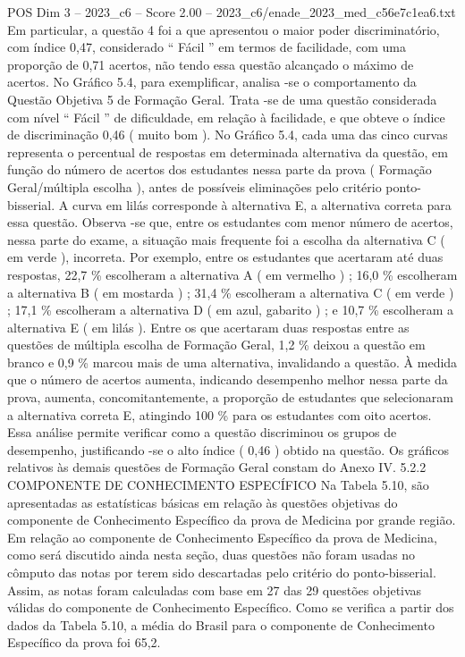 \begin{textsample}{POS Dim 3 – 2023\_c6 – Score 2.00 – 2023\_c6/enade\_2023\_med\_c56e7c1ea6.txt}
Em particular, a questão 4 foi a que apresentou o maior poder discriminatório, com índice 0,47, considerado “ Fácil ” em termos de facilidade, com uma proporção de 0,71 acertos, não tendo essa questão alcançado o máximo de acertos.
No Gráfico 5.4, para exemplificar, analisa -se o comportamento da Questão Objetiva 5 de Formação Geral.
Trata -se de uma questão considerada com nível “ Fácil ” de dificuldade, em relação à facilidade, e que obteve o índice de discriminação 0,46 ( muito bom ).
No Gráfico 5.4, cada uma das cinco curvas representa o percentual de respostas em determinada alternativa da questão, em função do número de acertos dos estudantes nessa parte da prova ( Formação Geral/múltipla escolha ), antes de possíveis eliminações pelo critério ponto-bisserial.
A curva em lilás corresponde à alternativa E, a alternativa correta para essa questão.
Observa -se que, entre os estudantes com menor número de acertos, nessa parte do exame, a situação mais frequente foi a escolha da alternativa C ( em verde ), incorreta.
Por exemplo, entre os estudantes que acertaram até duas respostas, 22,7 \% escolheram a alternativa A ( em vermelho ) ; 16,0 \% escolheram a alternativa B ( em mostarda ) ; 31,4 \% escolheram a alternativa C ( em verde ) ; 17,1 \% escolheram a alternativa D ( em azul, gabarito ) ; e 10,7 \% escolheram a alternativa E ( em lilás ).
Entre os que acertaram duas respostas entre as questões de múltipla escolha de Formação Geral, 1,2 \% deixou a questão em branco e 0,9 \% marcou mais de uma alternativa, invalidando a questão.
À medida que o número de acertos aumenta, indicando desempenho melhor nessa parte da prova, aumenta, concomitantemente, a proporção de estudantes que selecionaram a alternativa correta E, atingindo 100 \% para os estudantes com oito acertos.
Essa análise permite verificar como a questão discriminou os grupos de desempenho, justificando -se o alto índice ( 0,46 ) obtido na questão.
Os gráficos relativos às demais questões de Formação Geral constam do Anexo IV. 5.2.2 COMPONENTE DE CONHECIMENTO ESPECÍFICO Na Tabela 5.10, são apresentadas as estatísticas básicas em relação às questões objetivas do componente de Conhecimento Específico da prova de Medicina por grande região.
Em relação ao componente de Conhecimento Específico da prova de Medicina, como será discutido ainda nesta seção, duas questões não foram usadas no cômputo das notas por terem sido descartadas pelo critério do ponto-bisserial.
Assim, as notas foram calculadas com base em 27 das 29 questões objetivas válidas do componente de Conhecimento Específico.
Como se verifica a partir dos dados da Tabela 5.10, a média do Brasil para o componente de Conhecimento Específico da prova foi 65,2.

\end{textsample}
